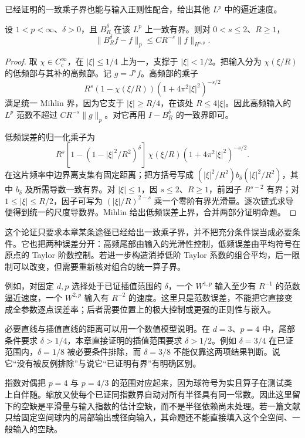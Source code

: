 已经证明的一致乘子界也能与输入正则性配合，给出其他 \(L^p\) 中的逼近速度。
\begin{proposition}\label{b2:prop:24-lp-rate}
设 \(1<p<\infty\)、\(\delta>0\)，且 \(B_R^\delta\) 在该 \(L^p\) 上一致有界。则对 \(0<s\leq2\)、\(R\geq1\)，
\[
 \|B_R^\delta f-f\|_p\leq C R^{-s}\|f\|_{H^{s,p}}.
\]
\end{proposition}
\begin{proof}
取 \(\chi\in C_c^\infty\)，在 \(|\xi|\leq1/4\) 上为一，支撑于 \(|\xi|<1/2\)。把输入分为 \(\chi(\xi/R)\) 的低频部与其补的高频部。记 \(g=J^sf\)。高频部的乘子
\[
 R^s(1-\chi(\xi/R))(1+4\pi^2|\xi|^2)^{-s/2}
\]
满足统一 Mihlin 界，因为它支于 \(|\xi|\geq R/4\)，在该处 \(R\leq4|\xi|\)。因此高频输入的 \(L^p\) 范数不超过 \(CR^{-s}\|g\|_p\)。对它再用 \(I-B_R^\delta\) 的一致界即可。

低频误差的归一化乘子为
\[
 R^s[1-(1-|\xi|^2/R^2)^\delta]\,
 \chi(\xi/R)(1+4\pi^2|\xi|^2)^{-s/2}.
\]
在这片频率中边界离支集有固定距离；把方括号写成
\((|\xi|^2/R^2)b_\delta(|\xi|^2/R^2)\)，其中 \(b_\delta\) 及所需导数一致有界。对 \(|\xi|\leq1\)，因 \(s\leq2\)、\(R\geq1\)，前因子 \(R^{s-2}\) 有界；对 \(1\leq|\xi|\leq R/2\)，因子可写为 \((|\xi|/R)^{2-s}\) 乘一个零阶有界光滑量。逐次链式求导便得到统一的尺度导数界。Mihlin 给出低频误差上界，合并两部分证明命题。
\end{proof}
这个论证只要求本章某条途径已经给出一致乘子界，并不把充分条件误当成必要条件。它也把两种误差分开：高频尾部由输入的光滑性控制，低频误差由平均符号在原点的 Taylor 阶数控制。若进一步构造消掉低阶 Taylor 系数的组合平均，后一限制可以改变，但需要重新核对组合的统一算子界。

\ProseParagraphBreak

例如，对固定 \(d,p\) 选择处于已证插值范围的 \(\delta\)，一个 \(W^{1,p}\) 输入至少有 \(R^{-1}\) 的范数逼近速度，一个 \(W^{2,p}\) 输入有 \(R^{-2}\) 的速度。这里只是范数误差，不能把它直接变成全参数逐点误差率；后者需要位置上的极大控制或更强的正则性与嵌入。

\ProseParagraphBreak

必要直线与插值直线的距离可以用一个数值模型说明。在 \(d=3\)、\(p=4\) 中，尾部条件要求 \(\delta>1/4\)，本章直接证明的插值范围要求 \(\delta>1/2\)。例如 \(\delta=3/4\) 在已证范围内，\(\delta=1/8\) 被必要条件排除，而 \(\delta=3/8\) 不能仅靠这两项结果判断。说它“没有被反例排除”与说它“已证明有界”有明确区别。

\ProseParagraphBreak

指数对偶把 \(p=4\) 与 \(p=4/3\) 的范围对应起来，因为球符号为实且算子在测试类上自伴随。缩放又使每个已证同指数界自动对所有半径具有同一常数。因此这里留下的空缺是平滑量与输入指数的估计空缺，而不是半径依赖尚未处理。若一篇文献只给固定空间球内的局部输出或径向输入，其命题还不能直接填入这个全空间、一般输入的空缺。

